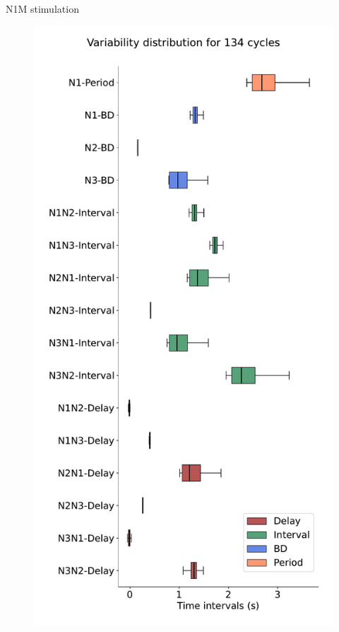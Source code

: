 \documentclass[aspectratio=43]{beamer}
\begin{document}
\begin{frame}{N1M stimulation}
	\hypertarget{modelinvariant}{}
	
	\begin{figure}[hbt!]
		\begin{minipage}[b]{0.36\textwidth}
			\centering
			\includegraphics[width=\textwidth]{invariants/data/MODEL/n1m_driven/images/3phases/_boxplot.pdf}

\end{minipage}
\end{figure}
\end{frame}
\end{document}
